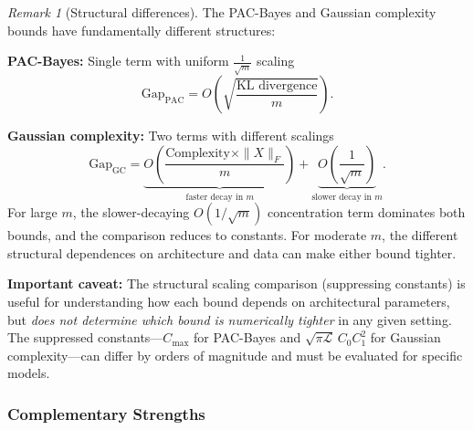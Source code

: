 \documentclass{article}
\theoremstyle{plain}
\theoremstyle{definition}
\theoremstyle{remark}
\newtheorem{remark}[theorem]{Remark}
\begin{document}
\begin{remark}[Structural differences]
The PAC-Bayes and Gaussian complexity bounds have fundamentally different structures:

\textbf{PAC-Bayes:} Single term with uniform $\frac{1}{\sqrt{m}}$ scaling
\[
\text{Gap}_{\text{PAC}} = O\left(\sqrt{\frac{\text{KL divergence}}{m}}\right).
\]

\textbf{Gaussian complexity:} Two terms with different scalings
\[
\text{Gap}_{\text{GC}}
= \underbrace{O\left(\frac{\text{Complexity} \times \|X\|_F}{m}\right)}_{\text{faster decay in }m}
+ \underbrace{O\left(\frac{1}{\sqrt{m}}\right)}_{\text{slower decay in }m}.
\]
For large $m$, the slower-decaying $O(1/\sqrt{m})$ concentration term dominates both bounds, and the comparison reduces to constants. For moderate $m$, the different structural dependences on architecture and data can make either bound tighter.

\textbf{Important caveat:} The structural scaling comparison (suppressing constants) is useful for understanding how each bound depends on architectural parameters, but \emph{does not determine which bound is numerically tighter} in any given setting. The suppressed constants---$C_{\max}$ for PAC-Bayes and $\sqrt{\pi\mathcal{L}}\, C_0 C_1^2$ for Gaussian complexity---can differ by orders of magnitude and must be evaluated for specific models.
\end{remark}

\subsubsection{Complementary Strengths}
\end{document}

